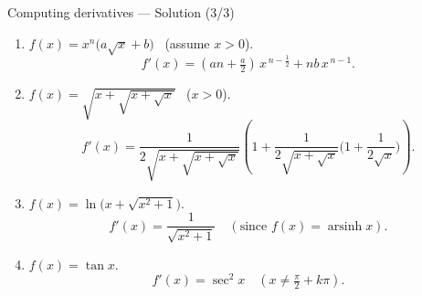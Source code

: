 \documentclass[9pt]{beamer}
\begin{document}
\begin{frame}{Computing derivatives — Solution (3/3)}

\small
\begin{enumerate}[leftmargin=0.55cm, label=(\alph*), start=11, rightmargin=0.2cm]

\item $f(x)=x^{n}\big(a\sqrt{x}+b\big)$ \ (assume $x>0$).
\[
\boxed{f'(x)=(an+\tfrac{a}{2})\,x^{\,n-\tfrac12}+nb\,x^{\,n-1}}.
\]

\item $f(x)=\sqrt{x+\sqrt{x+\sqrt{x}}}$ \ ($x>0$).
\[
\boxed{f'(x)=\frac{1}{2\sqrt{x+\sqrt{x+\sqrt{x}}}}
\left(1+\frac{1}{2\sqrt{x+\sqrt{x}}}\Big(1+\frac{1}{2\sqrt{x}}\Big)\right)}.
\]

\item $f(x)=\ln\!\big(x+\sqrt{x^2+1}\big)$.
\[
\boxed{f'(x)=\frac{1}{\sqrt{x^2+1}}}\quad(\text{since }f(x)=\operatorname{arsinh}x).
\]

\item $f(x)=\tan x$.
\[
\boxed{f'(x)=\sec^2 x}\quad (x\neq \tfrac{\pi}{2}+k\pi).
\]

\end{enumerate}

\end{frame}





    


    
\end{document}
